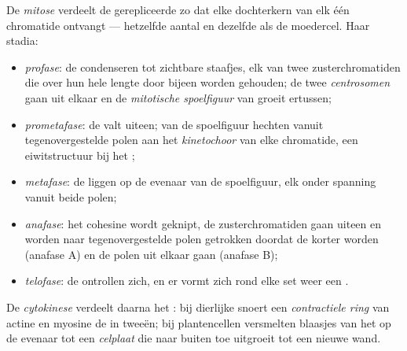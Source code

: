 \begin{definition}[Mitose]\label{def:b1:replication-mitosis:mitosis}
De \emph{mitose} verdeelt de gerepliceerde  zo dat elke dochterkern van
elk  één chromatide ontvangt --- hetzelfde aantal en dezelfde  als
de moedercel. Haar stadia:
\begin{itemize}
  \item \emph{profase}: de  condenseren tot zichtbare staafjes,
        elk van twee zusterchromatiden die over hun hele lengte door
         bijeen worden gehouden; de twee
        \emph{centrosomen} gaan uit elkaar en de \emph{mitotische
        spoelfiguur} van  groeit ertussen;
  \item \emph{prometafase}: de  valt uiteen;  van de
        spoelfiguur hechten vanuit tegenovergestelde polen aan het
        \emph{kinetochoor} van elke chromatide, een eiwitstructuur bij het
        ;
  \item \emph{metafase}: de  liggen op de evenaar van de
        spoelfiguur, elk onder spanning vanuit beide polen;
  \item \emph{anafase}: het cohesine wordt geknipt, de zusterchromatiden
        gaan uiteen en worden naar tegenovergestelde polen getrokken
        doordat de  korter worden (anafase A) en de polen uit
        elkaar gaan (anafase B);
  \item \emph{telofase}: de  ontrollen zich, en er vormt zich
        rond elke set weer een .
\end{itemize}
De \emph{cytokinese} verdeelt daarna het : bij dierlijke  snoert
een \emph{contractiele ring} van actine en myosine de  in tweeën; bij
plantencellen versmelten blaasjes van het  op de evenaar tot een
\emph{celplaat} die naar buiten toe uitgroeit tot een nieuwe wand.
\end{definition}

